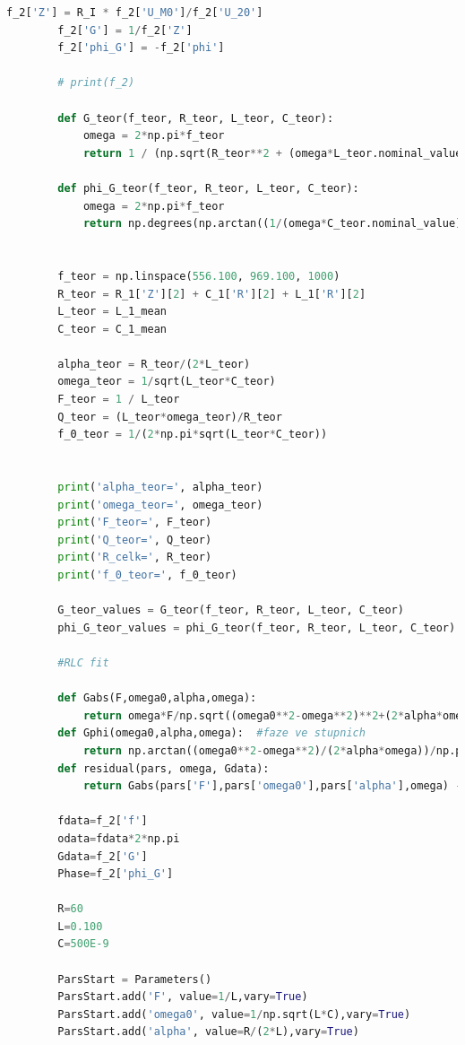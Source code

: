 \documentclass[a4paper,11pt]{article}
\begin{document}
\begin{lstlisting}[language=Python, basicstyle=\tiny, breaklines=true]
        f_2['Z'] = R_I * f_2['U_M0']/f_2['U_20']
        f_2['G'] = 1/f_2['Z']
        f_2['phi_G'] = -f_2['phi']
        
        # print(f_2)

        def G_teor(f_teor, R_teor, L_teor, C_teor):
            omega = 2*np.pi*f_teor
            return 1 / (np.sqrt(R_teor**2 + (omega*L_teor.nominal_value - 1/(omega*C_teor.nominal_value))**2))

        def phi_G_teor(f_teor, R_teor, L_teor, C_teor):
            omega = 2*np.pi*f_teor
            return np.degrees(np.arctan((1/(omega*C_teor.nominal_value)-(omega*L_teor.nominal_value))/R_teor))
        
        
        f_teor = np.linspace(556.100, 969.100, 1000)
        R_teor = R_1['Z'][2] + C_1['R'][2] + L_1['R'][2]
        L_teor = L_1_mean
        C_teor = C_1_mean
        
        alpha_teor = R_teor/(2*L_teor)
        omega_teor = 1/sqrt(L_teor*C_teor)
        F_teor = 1 / L_teor
        Q_teor = (L_teor*omega_teor)/R_teor
        f_0_teor = 1/(2*np.pi*sqrt(L_teor*C_teor))
        
        
        print('alpha_teor=', alpha_teor)
        print('omega_teor=', omega_teor)
        print('F_teor=', F_teor)
        print('Q_teor=', Q_teor)
        print('R_celk=', R_teor)
        print('f_0_teor=', f_0_teor)
        
        G_teor_values = G_teor(f_teor, R_teor, L_teor, C_teor)
        phi_G_teor_values = phi_G_teor(f_teor, R_teor, L_teor, C_teor)

        #RLC fit

        def Gabs(F,omega0,alpha,omega):
        	return omega*F/np.sqrt((omega0**2-omega**2)**2+(2*alpha*omega)**2)
        def Gphi(omega0,alpha,omega):  #faze ve stupnich
        	return np.arctan((omega0**2-omega**2)/(2*alpha*omega))/np.pi*180
        def residual(pars, omega, Gdata):
        	return Gabs(pars['F'],pars['omega0'],pars['alpha'],omega) - Gdata 
        
        fdata=f_2['f']
        odata=fdata*2*np.pi 
        Gdata=f_2['G']
        Phase=f_2['phi_G']
        
        R=60
        L=0.100
        C=500E-9
        
        ParsStart = Parameters()  
        ParsStart.add('F', value=1/L,vary=True)   
        ParsStart.add('omega0', value=1/np.sqrt(L*C),vary=True)  
        ParsStart.add('alpha', value=R/(2*L),vary=True)
        

\end{lstlisting}
\end{document}
